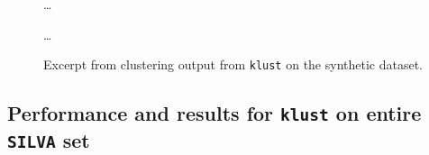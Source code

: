 \begin{figure}[H]
  \centering
  
  \dots
  
  \dots
  
  \caption{Excerpt from clustering output from \texttt{klust} on the
    synthetic dataset.}
  \label{fig:synth_silva_clustering}
\end{figure}


\subsection{Performance and results for \texttt{klust} on entire \texttt{SILVA} set}
\label{app:performance_results_full_SILVA}

